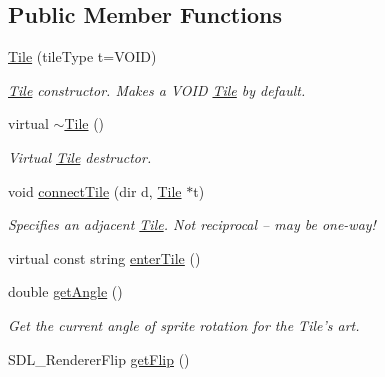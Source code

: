 \subsection*{Public Member Functions}
\begin{DoxyCompactItemize}
\item 
\hyperlink{class_tile_ae8839483d411c1324a0c89327a557194}{Tile} (tile\+Type t=V\+O\+ID)\hypertarget{class_tile_ae8839483d411c1324a0c89327a557194}{}\label{class_tile_ae8839483d411c1324a0c89327a557194}

\begin{DoxyCompactList}\small\item\em \hyperlink{class_tile}{Tile} constructor. Makes a V\+O\+ID \hyperlink{class_tile}{Tile} by default. \end{DoxyCompactList}\item 
virtual \hyperlink{class_tile_a98634abbd93fa13d0578d7103202d03d}{$\sim$\+Tile} ()\hypertarget{class_tile_a98634abbd93fa13d0578d7103202d03d}{}\label{class_tile_a98634abbd93fa13d0578d7103202d03d}

\begin{DoxyCompactList}\small\item\em Virtual \hyperlink{class_tile}{Tile} destructor. \end{DoxyCompactList}\item 
void \hyperlink{class_tile_ab29acce6f4bf7ea4617213269e8c3716}{connect\+Tile} (dir d, \hyperlink{class_tile}{Tile} $\ast$t)\hypertarget{class_tile_ab29acce6f4bf7ea4617213269e8c3716}{}\label{class_tile_ab29acce6f4bf7ea4617213269e8c3716}

\begin{DoxyCompactList}\small\item\em Specifies an adjacent \hyperlink{class_tile}{Tile}. Not reciprocal -- may be one-\/way! \end{DoxyCompactList}\item 
virtual const string \hyperlink{class_tile_ae04dfcac010592c1ef0aaae031f31b6a}{enter\+Tile} ()
\item 
double \hyperlink{class_tile_a947b6692bfcdd7b1adc59fcbee16c1fc}{get\+Angle} ()\hypertarget{class_tile_a947b6692bfcdd7b1adc59fcbee16c1fc}{}\label{class_tile_a947b6692bfcdd7b1adc59fcbee16c1fc}

\begin{DoxyCompactList}\small\item\em Get the current angle of sprite rotation for the Tile’s art. \end{DoxyCompactList}\item 
S\+D\+L\+\_\+\+Renderer\+Flip \hyperlink{class_tile_ad2d2b3bd012d3a54ccb51f6eb986115a}{get\+Flip} ()\hypertarget{class_tile_ad2d2b3bd012d3a54ccb51f6eb986115a}{}\label{class_tile_ad2d2b3bd012d3a54ccb51f6eb986115a}


\end{DoxyCompactItemize}
